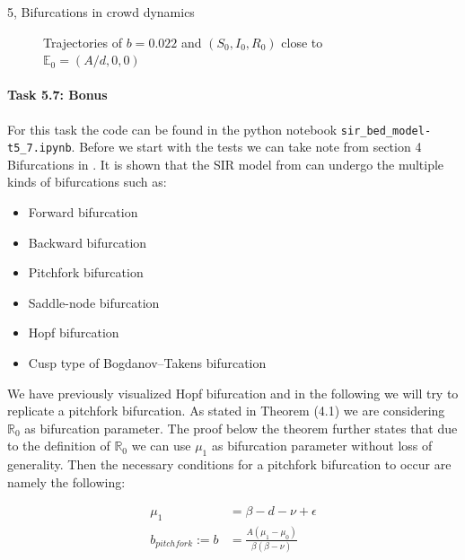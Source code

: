 \begin{task}{5, Bifurcations in crowd dynamics}
\begin{figure}[H]
\caption{Trajectories of $b=0.022$ and $(S_0, I_0, R_0)$ close to $\mathbb{E}_0=(A/d, 0,0)$}
\label{fig:t5_6-trajs}
\end{figure}

\newpage
\paragraph{Task 5.7: Bonus}
For this task the code can be found in the python notebook \verb|sir_bed_model-t5_7.ipynb|. Before we start with the tests we can take note from section 4 Bifurcations in \cite{shan2014bifurcations}. It is shown that the SIR model from \cite{shan2014bifurcations} can undergo the multiple kinds of bifurcations such as:
\begin{itemize}
    \item Forward bifurcation
    \item Backward bifurcation
    \item Pitchfork bifurcation
    \item Saddle-node bifurcation
    \item Hopf bifurcation
    \item Cusp type of Bogdanov–Takens bifurcation
\end{itemize}

 We have previously visualized Hopf bifurcation and in the following we will try to replicate a pitchfork bifurcation. As stated in \cite{shan2014bifurcations} Theorem (4.1) we are considering $\mathbb{R}_0$ as bifurcation parameter. The proof below the theorem  further states that due to the definition of $\mathbb{R}_0$ we can use $\mu_1$ as bifurcation parameter without loss of generality. Then the necessary conditions for a pitchfork bifurcation to occur are namely the following:

\begin{align*}
    \mu_1 &= \beta -d-\nu+\epsilon\\
    b_{pitchfork}:=b &= \frac{A(\mu_1 -\mu_0)}{\beta (\beta -\nu)}\\
\end{align*}


\end{task}
